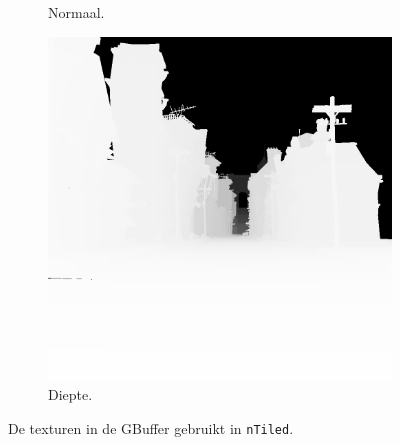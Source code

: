 \begin{figure}
\begin{subfigure}[b]{.325\textwidth}
    \caption{Normaal.}
    \label{fig:fds-gbuffer-ntiled:normal}
  \end{subfigure} %
  \begin{subfigure}[b]{.325\textwidth}
    \centering
    \includegraphics[width=\textwidth]{./img/raw/fds-gbuffer-ntiled/diepte.png}
    \caption{Diepte.}
    \label{fig:fds-gbuffer-ntiled:normal}
  \end{subfigure}
  \caption{De texturen in de GBuffer gebruikt in \texttt{nTiled}.}
  \label{fig:fds-gbuffer-nTiled}
\end{figure}

